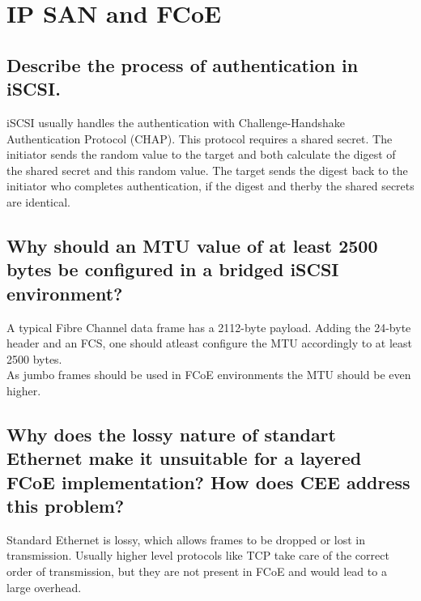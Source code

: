 \section{IP SAN and FCoE} %
\label{sec:ip_san_and_fcoe}

\subsection{Describe the process of authentication in iSCSI.} %
\label{sub:describe_the_process_of_authentication_in_iscsi}
	iSCSI usually handles the authentication with Challenge-Handshake Authentication Protocol (CHAP).
	This protocol requires a shared secret.
	The initiator sends the random value to the target 
	and both calculate the digest of the shared secret and this random value.
	The target sends the digest back to the initiator who completes authentication,
	if the digest and therby the shared secrets are identical.

\subsection{Why should an MTU value of at least 2500 bytes be configured in a bridged iSCSI environment?} %
\label{sub:why_should_an_mtu_value_of_at_least_2500_bytes_be_configured_in_a_bridged_iscsi_environment}
	A typical Fibre Channel data frame has a 2112-byte payload.
	Adding the 24-byte header and an FCS,
	one should atleast configure the MTU accordingly to at least 2500 bytes. \\
	As jumbo frames should be used in FCoE environments the MTU should be even higher.

\subsection{Why does the lossy nature of standart Ethernet make it unsuitable for a layered FCoE implementation? How does CEE address this problem?} %
\label{sub:why_does_the_lossy_nature_of_standart_ethernet_make_it_unsuitable_for_a_layered_fcoe_implementation_how_does_cee_address_this_problem}   	
	Standard Ethernet is lossy,
	which allows frames to be dropped or lost in transmission.
	Usually higher level protocols like TCP take care of the correct order of transmission,
	but they are not present in FCoE and would lead to a large overhead.

